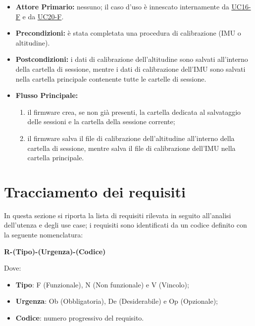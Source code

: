 \begin{itemize}
    \item \textbf{Attore Primario:} nessuno; il caso d'uso è innescato internamente da
    \hyperref[uc:uc_calibrazione_imu]{UC16-F} e da \hyperref[uc:uc_calibrazione_altitudine]{UC20-F}.

    \item \textbf{Precondizioni:} è stata completata una procedura di calibrazione (IMU o altitudine).

    \item \textbf{Postcondizioni:} i dati di calibrazione dell'altitudine sono salvati all'interno
    della cartella di sessione, mentre i dati di calibrazione dell'IMU sono salvati nella cartella
    principale contenente tutte le cartelle di sessione.

    \item \textbf{Flusso Principale:}
    \begin{enumerate}
        \item il firmware crea, se non già presenti, la cartella dedicata al salvataggio delle
        sessioni e la cartella della sessione corrente;
        \item il firmware salva il file di calibrazione dell'altitudine all'interno della cartella
        di sessione, mentre salva il file di calibrazione dell'IMU nella cartella principale.
    \end{enumerate}
\end{itemize}

\section{Tracciamento dei requisiti} \label{sec:tracciamento_requisiti}
In questa sezione si riporta la lista di requisiti rilevata in seguito all'analisi dell'utenza e degli use
case; i requisiti sono identificati da un codice definito con la seguente nomenclatura:
\begin{center}
\textbf{R-(Tipo)-(Urgenza)-(Codice)}
\end{center}
Dove:
\begin{itemize}
    \item \textbf{Tipo}: F (Funzionale), N (Non funzionale) e V (Vincolo);
    \item \textbf{Urgenza}: Ob (Obbligatoria), De (Desiderabile) e Op (Opzionale);
    \item \textbf{Codice}: numero progressivo del requisito.
\end{itemize}

